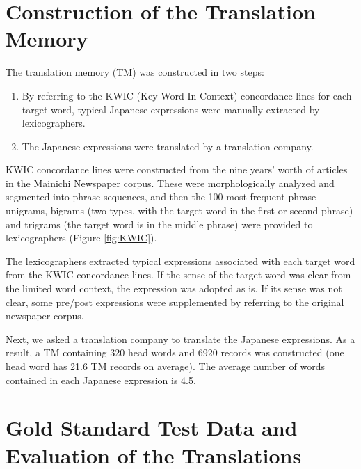 \section{Construction of the Translation Memory}

The translation memory (TM) was constructed in two steps:
\begin{enumerate}
\item By referring to the KWIC (Key Word In Context) concordance lines
  for each target word, typical Japanese expressions were manually
  extracted by lexicographers.
 \item The Japanese expressions were translated by a translation company.
\end{enumerate}

KWIC concordance lines were constructed from the nine years' worth of
articles in the Mainichi Newspaper corpus.  These were morphologically
analyzed and segmented into phrase sequences, and then the 100 most
frequent phrase unigrams, bigrams (two types, with the target word in
the first or second phrase) and trigrams (the target word is in the
middle phrase) were provided to  lexicographers (Figure \ref{fig:KWIC}).

The lexicographers extracted typical expressions associated with each
target word from the KWIC concordance lines.  If the sense of the target
word was clear from the limited word context, the expression was adopted
as is.  If its sense was not clear, some pre/post expressions were
supplemented by referring to the original newspaper corpus.

Next, we asked a translation company to translate the Japanese
expressions.  As a result, a TM containing 320 head words and 6920
records was constructed (one head word has 21.6 TM records on average).
The average number of words contained in each Japanese expression is 4.5.



\section{Gold Standard Test Data and Evaluation of the Translations}

